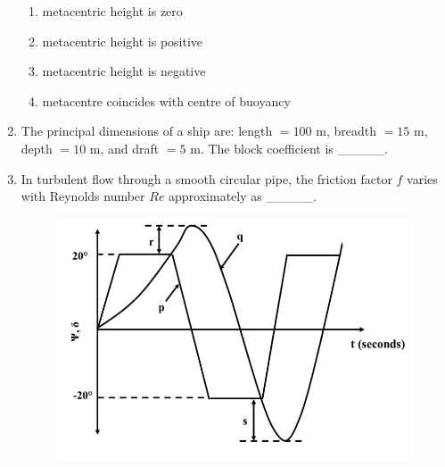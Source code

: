 \documentclass[journal,12pt,onecolumn]{IEEEtran}
\theoremstyle{remark}
\begin{document}
\begin{enumerate}
\begin{enumerate}[label=\Alph*.]
\item metacentric height is zero 
\item metacentric height is positive 
\item metacentric height is negative 
\item metacentre coincides with centre of buoyancy
\end{enumerate}

\item The principal dimensions of a ship are: length $= 100$ m, breadth $= 15$ m, depth $= 10$ m, and draft $= 5$ m.  
The block coefficient is \_\_\_\_\_.\hfill{}

\begin{enumerate}[label=\Alph*.]
\end{enumerate}

\item In turbulent flow through a smooth circular pipe, the friction factor $f$ varies with Reynolds number $Re$ approximately as \_\_\_\_\_.\hfill{}

\begin{figure}[H]
    \centering
    \includegraphics[scale=0.3]{figs/q16.jpg}
    \caption{}
    \label{fig:figure1}
\end{figure}


\end{enumerate}
\end{document}
